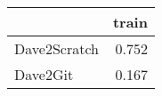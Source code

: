 \begin{tabular}{lr}
\toprule
{} &  train \\
\midrule
Dave2Scratch &  0.752 \\
Dave2Git     &  0.167 \\
\bottomrule
\end{tabular}
